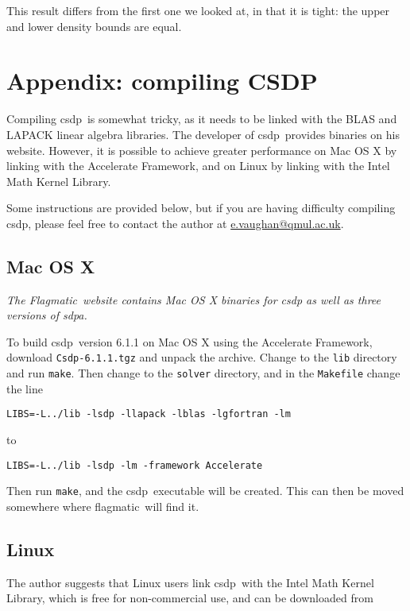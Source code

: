 \documentclass{article}
\let\temptt\texttt
\renewcommand\texttt[1]{{\color{excolor} \temptt{#1}}}
\providecommand{\flagmatic}{Flagmatic}
\providecommand{\flagmaticexe}{flagmatic}
\providecommand{\csdp}{csdp}
\begin{document}
This result differs from the first one we looked at, in that it is tight: the upper and lower density bounds are equal.


\section{Appendix: compiling CSDP} \label{csdp}

Compiling \csdp\ is somewhat tricky, as it needs to be linked with the BLAS and LAPACK linear algebra libraries. The developer of \csdp\ provides binaries on his website. However, it is possible to achieve greater performance on Mac OS X by linking with the Accelerate Framework, and on Linux by linking with the Intel Math Kernel Library.

Some instructions are provided below, but if you are having difficulty compiling \csdp, please feel free to contact the author at \url{e.vaughan@qmul.ac.uk}.

\subsection{Mac OS X}

\textit{The \flagmatic\ website contains Mac OS X binaries for csdp as well as three versions of sdpa.}

To build \csdp\ version 6.1.1 on Mac OS X using the Accelerate Framework, download \texttt{Csdp-6.1.1.tgz} and unpack the archive. Change to the \texttt{lib} directory and run \texttt{make}. Then change to the \texttt{solver} directory, and in the \texttt{Makefile} change the line

\begin{verbatim}
LIBS=-L../lib -lsdp -llapack -lblas -lgfortran -lm
\end{verbatim}

to

\begin{verbatim}
LIBS=-L../lib -lsdp -lm -framework Accelerate
\end{verbatim}

Then run \texttt{make}, and the \csdp\ executable will be created. This can then be moved somewhere where \flagmaticexe\ will find it.

\subsection{Linux}

The author suggests that Linux users link \csdp\ with the Intel Math Kernel Library, which is free for non-commercial use, and can be downloaded from
\end{document}
